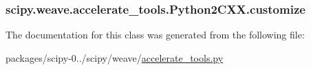 \subsubsection[{customize}]{\setlength{\rightskip}{0pt plus 5cm}scipy.\+weave.\+accelerate\+\_\+tools.\+Python2\+C\+X\+X.\+customize}\label{classscipy_1_1weave_1_1accelerate__tools_1_1Python2CXX_ac193e423c8f862a6732267d08e894777}


The documentation for this class was generated from the following file\+:\begin{DoxyCompactItemize}
\item 
packages/scipy-\/0../scipy/weave/\hyperlink{accelerate__tools_8py}{accelerate\+\_\+tools.\+py}\end{DoxyCompactItemize}
